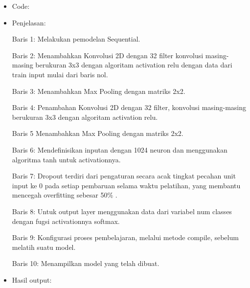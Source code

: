 \begin{itemize}
\item Code:


\item Penjelasan:

Baris 1: Melakukan pemodelan Sequential.

Baris 2: Menambahkan Konvolusi 2D dengan 32 filter konvolusi masing-masing berukuran 3x3 dengan algoritam activation relu dengan data dari train input mulai dari baris nol.

Baris 3: Menambahkan Max Pooling dengan matriks 2x2.

Baris 4: Penambahan Konvolusi 2D dengan 32 filter, konvolusi masing-masing berukuran 3x3 dengan algoritam activation relu.

Baris 5 Menambahkan Max Pooling dengan matriks 2x2.

Baris 6: Mendefinisikan inputan dengan 1024 neuron dan menggunakan algoritma tanh untuk activationnya.

Baris 7: Dropout terdiri dari pengaturan secara acak tingkat pecahan unit input ke 0 pada setiap pembaruan selama waktu pelatihan, yang membantu mencegah overfitting sebesar 50\% .

Baris 8: Untuk output layer menggunakan data dari variabel num classes dengan fugsi activationnya softmax.

Baris 9: Konfigurasi proses pembelajaran, melalui metode compile, sebelum melatih suatu model.

Baris 10: Menampilkan model yang telah dibuat.

\item Hasil output:


\end{itemize}
